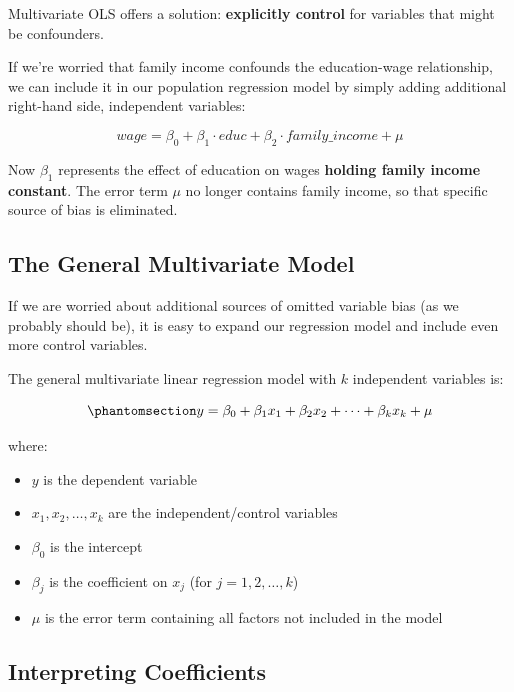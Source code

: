 \documentclass[
  letterpaper,
  DIV=11,
  numbers=noendperiod]{scrreprt}
\providecommand{\tightlist}{%
  \setlength{\itemsep}{0pt}\setlength{\parskip}{0pt}}
\begin{document}
Multivariate OLS offers a solution: \textbf{explicitly control} for
variables that might be confounders.

If we're worried that family income confounds the education-wage
relationship, we can include it in our population regression model by
simply adding additional right-hand side, independent variables:

\[
wage = \beta_0 + \beta_1 \cdot educ + \beta_2 \cdot family\_income + \mu
\]

Now \(\beta_1\) represents the effect of education on wages
\textbf{holding family income constant}. The error term \(\mu\) no
longer contains family income, so that specific source of bias is
eliminated.

\subsection{The General Multivariate
Model}\label{the-general-multivariate-model}

If we are worried about additional sources of omitted variable bias (as
we probably should be), it is easy to expand our regression model and
include even more control variables.

The general multivariate linear regression model with \(k\) independent
variables is:

\begin{equation}\protect\phantomsection\label{eq-multivariate}{
y = \beta_0 + \beta_1 x_1 + \beta_2 x_2 + \cdots + \beta_k x_k + \mu
}\end{equation}

where:

\begin{itemize}
\tightlist
\item
  \(y\) is the dependent variable
\item
  \(x_1, x_2, \ldots, x_k\) are the independent/control variables
\item
  \(\beta_0\) is the intercept
\item
  \(\beta_j\) is the coefficient on \(x_j\) (for
  \(j = 1, 2, \ldots, k\))
\item
  \(\mu\) is the error term containing all factors not included in the
  model
\end{itemize}

\subsection{Interpreting Coefficients}\label{interpreting-coefficients}
\end{document}
